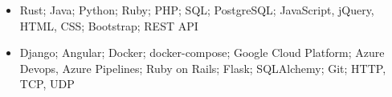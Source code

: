 \begin{cvsubsection}{}{}{}	
	\begin{itemize}
		\item Rust; Java; Python; Ruby; PHP; SQL; PostgreSQL; JavaScript, jQuery, HTML, CSS; Bootstrap; REST API
		\item Django; Angular; Docker; docker-compose; Google Cloud Platform; Azure Devops, Azure Pipelines; Ruby on Rails; Flask; SQLAlchemy; Git; HTTP, TCP, UDP
	\end{itemize}
\end{cvsubsection}
